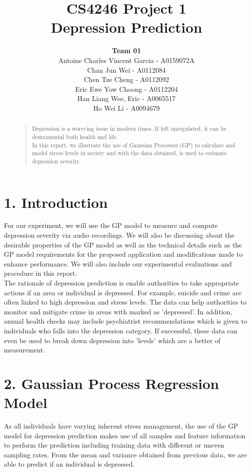 \documentclass{article}
\title{
	CS4246 Project 1\\ Depression Prediction
}
\author{
	{\bf Team 01} \\
	Antoine Charles Vincent Garcia - A0159072A\\
	Chan Jun Wei - A0112084\\
	Chen Tze Cheng - A0112092\\
	Eric Ewe Yow Choong - A0112204\\
	Han Liang Wee, Eric - A0065517\\
	Ho Wei Li - A0094679\\
}
\begin{document}
 	\maketitle

	\begin{abstract}
	\begin{quote}
	Depression is a worrying issue in modern times. If left unregulated, it can be dentrimental both health and life. \\
	
	In this report, we illustrate the use of Gaussian Processes (GP) to calculate and model stress levels in society and with the data obtained, is used to estimate depression severity.
	\end{quote}
	\end{abstract}
	
	\section{1.	  Introduction}
	For our experiment, we will use the GP model to measure and compute depression severity via audio recordings. We will also be discussing about the desirable properties of the GP model as well as the technical details such as the GP model requirements for the proposed application and modifications made to enhance performance. We will also include our experimental evaluations and procedure in this report. \\

	The rationale of depression prediction is enable authorities to take appropriate actions if an area or individual is depressed. For example, suicide and crime are often linked to high depression and stress levels. The data can help authorities to monitor and mitigate crime in areas with marked as 'depressed'. In addition, annual health checks may include psychiatrist recommendations which is given to individuals who falls into the depression category. If successful, these data can even be used to break down depression into 'levels' which are a better of measurement.

	\section{2.  Gaussian Process Regression Model}
	As all individuals have varying inherent stress management, the use of the GP model for depression prediction makes use of all samples and feature information to perform the prediction including training data with different or uneven sampling rates. From the mean and variance obtained from previous data, we are able to predict if an individual is depressed. \\	
\end{document}
